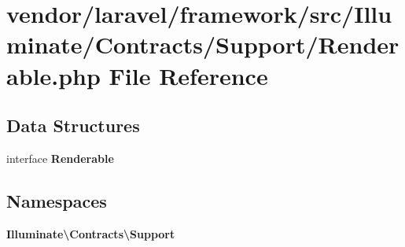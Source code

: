 \section{vendor/laravel/framework/src/\+Illuminate/\+Contracts/\+Support/\+Renderable.php File Reference}
\label{_renderable_8php}
\subsection*{Data Structures}
\begin{DoxyCompactItemize}
\item 
interface {\bf Renderable}
\end{DoxyCompactItemize}
\subsection*{Namespaces}
\begin{DoxyCompactItemize}
\item 
 {\bf Illuminate\textbackslash{}\+Contracts\textbackslash{}\+Support}
\end{DoxyCompactItemize}
